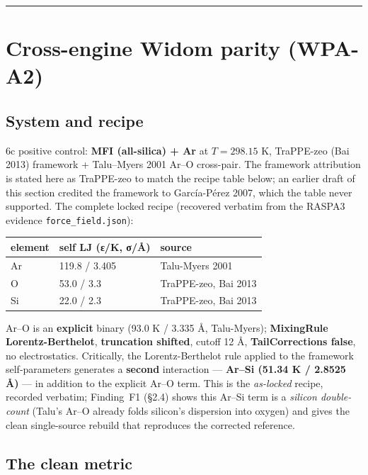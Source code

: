 \begin{center}\rule{0.5\linewidth}{0.5pt}\end{center}

\section{Cross-engine Widom parity
(WPA-A2)}\label{cross-engine-widom-parity-wpa-a2}

\subsection{System and recipe}\label{system-and-recipe}

6c positive control: \textbf{MFI (all-silica) + Ar} at \(T = 298.15\) K,
TraPPE-zeo (Bai 2013) framework + Talu--Myers 2001 Ar--O cross-pair. The
framework attribution is stated here as TraPPE-zeo to match the recipe
table below; an earlier draft of this section credited the framework to
García-Pérez 2007, which the table never supported. The complete locked
recipe (recovered verbatim from the RASPA3 evidence
\texttt{force\_field.json}):

{%
\begin{longtable}[]{@{}lll@{}}
\toprule\noalign{}
element & self LJ (ε/K, σ/Å) & source \\
\midrule\noalign{}
\endhead
\bottomrule\noalign{}
\endlastfoot
Ar & 119.8 / 3.405 & Talu-Myers 2001 \\
O & 53.0 / 3.3 & TraPPE-zeo, Bai 2013 \\
Si & 22.0 / 2.3 & TraPPE-zeo, Bai 2013 \\
\end{longtable}
}

Ar--O is an \textbf{explicit} binary (93.0 K / 3.335 Å, Talu-Myers);
\textbf{MixingRule Lorentz-Berthelot}, \textbf{truncation shifted},
cutoff 12 Å, \textbf{TailCorrections false}, no electrostatics.
Critically, the Lorentz-Berthelot rule applied to the framework
self-parameters generates a \textbf{second} interaction ---
\textbf{Ar--Si (51.34 K / 2.8525 Å)} --- in addition to the explicit
Ar--O term. This is the \emph{as-locked} recipe, recorded verbatim;
Finding~F1 (§2.4) shows this Ar--Si term is a \emph{silicon double-count}
(Talu's Ar--O already folds silicon's dispersion into oxygen) and gives
the clean single-source rebuild that reproduces the corrected reference.

\subsection{The clean metric}\label{the-clean-metric}

